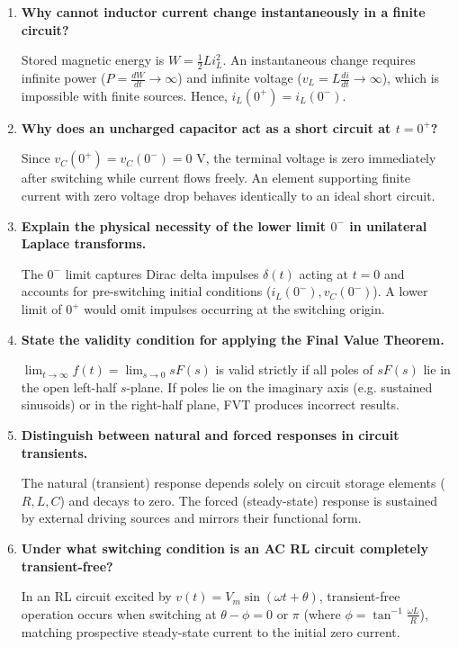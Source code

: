 \documentclass[12pt,a4paper]{article}
\newcommand{\Q}[1]{\textbf{#1}\par\noindent\ignorespaces}
\begin{document}
\begin{tcolorbox}[exambox, title={\textbf{Frequently Asked / Viva Questions}}]
\begin{enumerate}[topsep=0pt, label=\textbf{Q\arabic*.}, itemsep=4pt]
  \item \Q{Why cannot inductor current change instantaneously in a finite circuit?}
  Stored magnetic energy is $W = \frac{1}{2}L i_L^2$. An instantaneous change requires infinite power ($P = \frac{dW}{dt} \to \infty$) and infinite voltage ($v_L = L \frac{di}{dt} \to \infty$), which is impossible with finite sources. Hence, $i_L(0^+) = i_L(0^-)$.

  \item \Q{Why does an uncharged capacitor act as a short circuit at $t = 0^+$?}
  Since $v_C(0^+) = v_C(0^-) = 0\text{ V}$, the terminal voltage is zero immediately after switching while current flows freely. An element supporting finite current with zero voltage drop behaves identically to an ideal short circuit.

  \item \Q{Explain the physical necessity of the lower limit $0^-$ in unilateral Laplace transforms.}
  The $0^-$ limit captures Dirac delta impulses $\delta(t)$ acting at $t=0$ and accounts for pre-switching initial conditions ($i_L(0^-), v_C(0^-)$). A lower limit of $0^+$ would omit impulses occurring at the switching origin.

  \item \Q{State the validity condition for applying the Final Value Theorem.}
  $\lim_{t \to \infty} f(t) = \lim_{s \to 0} sF(s)$ is valid strictly if all poles of $sF(s)$ lie in the open left-half $s$-plane. If poles lie on the imaginary axis (e.g. sustained sinusoids) or in the right-half plane, FVT produces incorrect results.

  \item \Q{Distinguish between natural and forced responses in circuit transients.}
  The natural (transient) response depends solely on circuit storage elements ($R, L, C$) and decays to zero. The forced (steady-state) response is sustained by external driving sources and mirrors their functional form.

  \item \Q{Under what switching condition is an AC RL circuit completely transient-free?}
  In an RL circuit excited by $v(t) = V_m\sin(\omega t + \theta)$, transient-free operation occurs when switching at $\theta - \phi = 0$ or $\pi$ (where $\phi = \tan^{-1}\frac{\omega L}{R}$), matching prospective steady-state current to the initial zero current.


\end{enumerate}
\end{tcolorbox}
\end{document}
